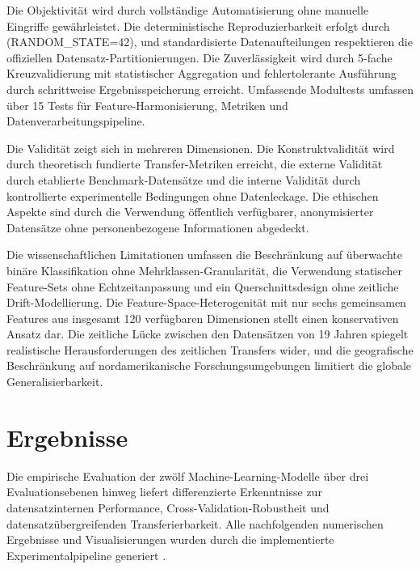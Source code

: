 \documentclass[11pt,a4paper]{article}
\begin{document}
    Die Objektivität wird durch vollständige Automatisierung ohne manuelle Eingriffe gewährleistet. Die deterministische Reproduzierbarkeit erfolgt durch (RANDOM\_STATE=42), und standardisierte Datenaufteilungen respektieren die offiziellen Datensatz-Partitionierungen. Die Zuverlässigkeit wird durch 5-fache Kreuzvalidierung mit statistischer Aggregation und fehlertolerante Ausführung durch schrittweise Ergebnisspeicherung erreicht. Umfassende Modultests umfassen über 15 Tests für Feature-Harmonisierung, Metriken und Datenverarbeitungspipeline.

    Die Validität zeigt sich in mehreren Dimensionen. Die Konstruktvalidität wird durch theoretisch fundierte Transfer-Metriken erreicht, die externe Validität durch etablierte Benchmark-Datensätze und die interne Validität durch kontrollierte experimentelle Bedingungen ohne Datenleckage. Die ethischen Aspekte sind durch die Verwendung öffentlich verfügbarer, anonymisierter Datensätze ohne personenbezogene Informationen abgedeckt.

    Die wissenschaftlichen Limitationen umfassen die Beschränkung auf überwachte binäre Klassifikation ohne Mehrklassen-Granularität, die Verwendung statischer Feature-Sets ohne Echtzeitanpassung und ein Querschnittsdesign ohne zeitliche Drift-Modellierung. Die Feature-Space-Heterogenität mit nur sechs gemeinsamen Features aus insgesamt 120 verfügbaren Dimensionen stellt einen konservativen Ansatz dar. Die zeitliche Lücke zwischen den Datensätzen von 19 Jahren spiegelt realistische Herausforderungen des zeitlichen Transfers wider, und die geografische Beschränkung auf nordamerikanische Forschungsumgebungen limitiert die globale Generalisierbarkeit.

    \section{Ergebnisse}

    Die empirische Evaluation der zwölf Machine-Learning-Modelle über drei Evaluationsebenen hinweg liefert differenzierte Erkenntnisse zur datensatzinternen Performance, Cross-Validation-Robustheit und datensatzübergreifenden Transferierbarkeit. Alle nachfolgenden numerischen Ergebnisse und Visualisierungen wurden durch die implementierte Experimentalpipeline generiert \parencite{Weirauch2025}.
\end{document}
